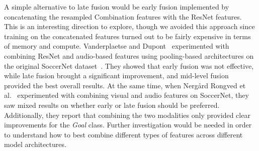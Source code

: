 \documentclass[10pt,twocolumn,letterpaper]{article}
\begin{document}
A simple alternative to late fusion would be early fusion implemented by concatenating the resampled Combination features with the ResNet features. This is an interesting direction to explore, though we avoided this approach since training on the concatenated features turned out to be fairly expensive in terms of memory and compute. Vanderplaetse and Dupont~\cite{vanderplaetse2020improved} experimented with combining ResNet and audio-based features using pooling-based architectures on the original SoccerNet dataset~\cite{giancola2018soccernet}. They showed that early fusion was not effective, while late fusion brought a significant improvement, and mid-level fusion provided the best overall results. At the same time, when Nerg{\aa}rd Rongved et al.~\cite{rongved2020real} experimented with combining visual and audio features on SoccerNet, they saw mixed results on whether early or late fusion should be preferred. Additionally, they report that combining the two modalities only provided clear improvements for the {\it Goal} class. Further investigation would be needed in order to understand how to best combine different types of features across different model architectures.
\end{document}
